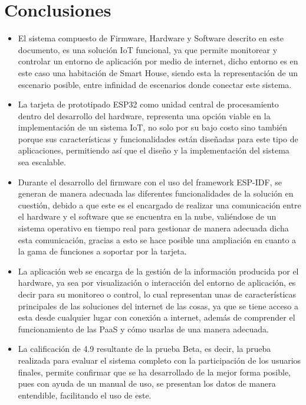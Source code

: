 \chapter{Conclusiones}

\begin{itemize}
	\item El sistema compuesto de Firmware, Hardware y Software descrito en este documento, es una solución IoT funcional, ya que permite monitorear y controlar un entorno de aplicación por medio de internet, dicho entorno es en este caso una habitación de Smart House, siendo esta la representación de un escenario posible, entre infinidad de escenarios donde conectar este sistema.
	\item La tarjeta de prototipado ESP32 como unidad central de procesamiento dentro del desarrollo del hardware, representa una opción viable en la implementación de un sistema IoT, no solo por su bajo costo sino también porque sus características y funcionalidades están diseñadas para este tipo de aplicaciones, permitiendo así que el diseño y la implementación del sistema sea escalable.
	\item Durante el desarrollo del firmware con el uso del framework ESP-IDF, se generan de manera adecuada las diferentes funcionalidades de la solución en cuestión, debido a que este es el encargado de realizar una comunicación entre el hardware y el software que se encuentra en la nube, valiéndose de un sistema operativo en tiempo real para gestionar de manera adecuada dicha esta comunicación, gracias a esto se hace posible una ampliación en cuanto a la gama de funciones a soportar por la tarjeta. 
	\item La aplicación web se encarga de la gestión de la información producida por el hardware, ya sea por visualización o interacción del entorno de aplicación, es decir para su monitoreo o control, lo cual representan unas de características principales de las soluciones del internet de las cosas, ya que se tiene acceso a esta desde cualquier lugar con conexión a internet, además de comprender el funcionamiento de las PaaS y cómo usarlas de una manera adecuada.
	\item La calificación de 4.9 resultante de la prueba Beta, es decir, la prueba realizada para evaluar el sistema completo con la participación de los usuarios finales, permite confirmar que se ha desarrollado de la mejor forma posible, pues con ayuda de un manual de uso, se presentan los datos de manera entendible, facilitando el uso de este.
		
\end{itemize}